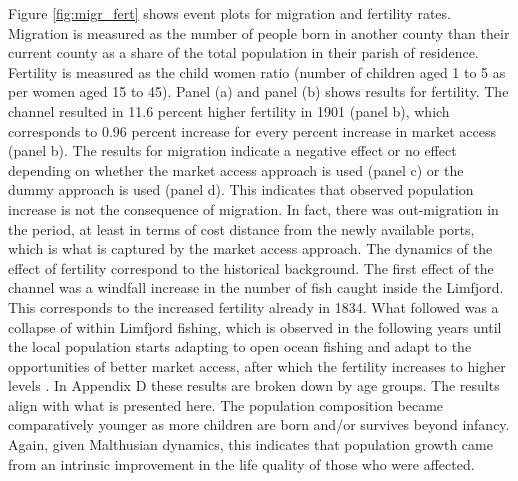 \documentclass[11pt]{article}
\begin{document}
Figure \ref{fig:migr_fert} shows event plots for migration and fertility rates. Migration is measured as the number of people born in another county than their current county as a share of the total population in their parish of residence. Fertility is measured as the child women ratio (number of children aged 1 to 5 as per women aged 15 to 45). Panel (a) and panel (b) shows results for fertility. The channel resulted in 11.6 percent higher fertility in 1901 (panel b), which corresponds to 0.96 percent increase for every percent increase in market access (panel b). The results for migration indicate a negative effect or no effect depending on whether the market access approach is used (panel c) or the dummy approach is used (panel d). This indicates that observed population increase is not the consequence of migration. In fact, there was out-migration in the period, at least in terms of cost distance from the newly available ports, which is what is captured by the market access approach. The dynamics of the effect of fertility correspond to the historical background. The first effect of the channel was a windfall increase in the number of fish caught inside the Limfjord. This corresponds to the increased fertility already in 1834. What followed was a collapse of within Limfjord fishing, which is observed in the following years until the local population starts adapting to open ocean fishing and adapt to the opportunities of better market access, after which the fertility increases to higher levels \citep{Poulsen2007, Poulsen2022}. In Appendix D these results are broken down by age groups. The results align with what is presented here. The population composition became comparatively younger as more children are born and/or survives beyond infancy. Again, given Malthusian dynamics, this indicates that population growth came from an intrinsic improvement in the life quality of those who were affected. 
\end{document}
